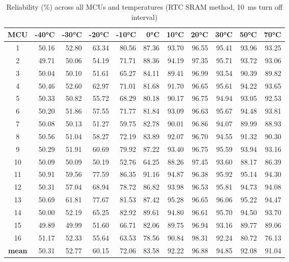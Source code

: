 \begin{table}[ht!]
    \centering
    \begin{tabular}{c||rrrrrrrrrr}
    \toprule
    \textbf{MCU} & \textbf{-40°C} & \textbf{-30°C} & \textbf{-20°C} & \textbf{-10°C} & \textbf{0°C} & \textbf{10°C} & \textbf{20°C} & \textbf{30°C} & \textbf{50°C} & \textbf{70°C} \\
    \midrule
    1    &  50.16 &  52.80 &  63.34 &  80.56 & 87.36 & 93.70 & 96.55 & 95.41 & 93.96 & 93.25 \\
    2    &  49.71 &  50.06 &  54.19 &  71.71 & 88.36 & 94.19 & 97.35 & 95.71 & 93.72 & 93.06 \\
    3    &  50.04 &  50.10 &  51.61 &  65.27 & 84.11 & 89.41 & 96.99 & 93.54 & 90.39 & 89.82 \\
    4    &  50.46 &  52.60 &  62.97 &  71.01 & 81.68 & 91.70 & 96.65 & 95.61 & 94.22 & 93.65 \\
    5    &  50.33 &  50.82 &  55.72 &  68.29 & 80.18 & 90.17 & 96.75 & 94.94 & 93.05 & 92.53 \\
    6    &  50.20 &  51.86 &  57.55 &  71.77 & 81.84 & 93.09 & 96.63 & 95.67 & 94.48 & 93.81 \\
    7    &  50.08 &  50.13 &  51.27 &  59.75 & 82.78 & 90.01 & 96.86 & 94.07 & 89.99 & 88.93 \\
    8    &  50.56 &  51.04 &  58.27 &  72.19 & 83.89 & 92.07 & 96.70 & 94.55 & 91.32 & 90.30 \\
    9    &  50.29 &  51.91 &  60.69 &  79.92 & 87.22 & 93.40 & 96.75 & 95.59 & 93.94 & 93.16 \\
    10   &  50.09 &  50.09 &  50.19 &  52.76 & 64.25 & 88.26 & 97.45 & 93.60 & 88.17 & 86.39 \\
    11   &  50.91 &  59.56 &  77.59 &  86.35 & 91.16 & 94.87 & 96.38 & 95.92 & 95.14 & 94.30 \\
    12   &  50.31 &  57.04 &  68.94 &  78.72 & 86.82 & 93.98 & 96.53 & 95.81 & 94.73 & 94.08 \\
    13   &  50.69 &  61.81 &  77.67 &  81.53 & 87.42 & 95.28 & 96.65 & 96.06 & 95.22 & 94.47 \\
    14   &  50.00 &  52.19 &  65.25 &  82.92 & 89.61 & 94.80 & 96.61 & 95.70 & 94.50 & 93.70 \\
    15   &  49.89 &  49.99 &  51.60 &  66.71 & 82.06 & 89.75 & 96.94 & 93.16 & 89.77 & 89.06 \\
    16   &  51.17 &  52.33 &  55.64 &  63.53 & 78.56 & 90.84 & 98.31 & 92.24 & 80.72 & 76.13 \\
    \textbf{mean} &  50.31 &  52.77 &  60.15 &  72.06 & 83.58 & 92.22 & 96.88 & 94.85 & 92.08 & 91.04 \\
    \bottomrule
    \end{tabular}
    \captionsetup{justification=centering,margin=0.5cm}
    \caption{Reliability (\%) across all MCUs and temperatures (RTC SRAM method, 10~ms turn off interval)}
    \label{table:reliability_rtc_sram}
    \vspace{-0.7cm}
\end{table}

